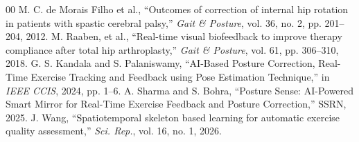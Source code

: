 \documentclass[conference]{IEEEtran}
\begin{document}
\begin{thebibliography}{00}
 M. C. de Morais Filho et al., ``Outcomes of correction of internal hip rotation in patients with spastic cerebral palsy,'' \emph{Gait \& Posture}, vol. 36, no. 2, pp. 201--204, 2012.
 M. Raaben, et al., ``Real-time visual biofeedback to improve therapy compliance after total hip arthroplasty,'' \emph{Gait \& Posture}, vol. 61, pp. 306--310, 2018.
 G. S. Kandala and S. Palaniswamy, ``AI-Based Posture Correction, Real-Time Exercise Tracking and Feedback using Pose Estimation Technique,'' in \emph{IEEE CCIS}, 2024, pp. 1--6.
 A. Sharma and S. Bohra, ``Posture Sense: AI-Powered Smart Mirror for Real-Time Exercise Feedback and Posture Correction,'' SSRN, 2025.
 J. Wang, ``Spatiotemporal skeleton based learning for automatic exercise quality assessment,'' \emph{Sci. Rep.}, vol. 16, no. 1, 2026.
\end{thebibliography}
\end{document}
